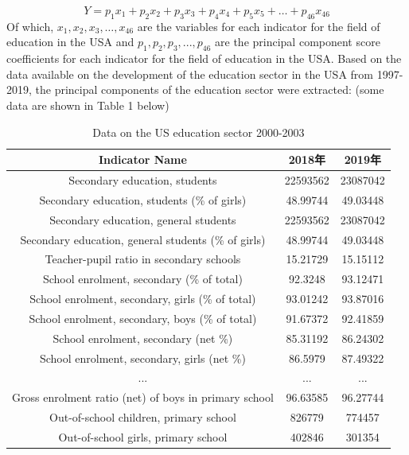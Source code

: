 \documentclass{apmcmthesis}
\begin{document}
\begin{equation}
Y=p_1x_1+p_2x_2+p_3x_3+p_4x_4+p_5x_5+…+p_{46}x_{46} 
\end{equation}
Of which, $ x_1,x_2,x_3,…,x_{46} $ are the variables for each indicator for the field of education in the USA and $ p_1,p_2,p_3,...,p_{46} $ are the principal component score coefficients for each indicator for the field of education in the USA.
Based on the data available on the development of the education sector in the USA from 1997-2019, the principal components of the education sector were extracted: (some data are shown in Table 1 below)
\begin{table}[H]
	\caption{Data on the US education sector 2000-2003}\label{tab:101} \centering
	\begin{tabular}{ccc}
		\toprule[1.5pt]
		Indicator Name        & 2018年    & 2019年      \\
		\midrule[1pt]
Secondary education, students                                              & 22593562 & 23087042 \\
Secondary education, students (\% of girls)                                & 48.99744 & 49.03448 \\
Secondary education, general students                                      & 22593562 & 23087042 \\
Secondary education, general students (\% of girls)                        & 48.99744 & 49.03448 \\
Teacher-pupil ratio in secondary schools                                   & 15.21729 & 15.15112 \\
School enrolment, secondary (\% of total)                                  & 92.3248  & 93.12471 \\
School enrolment, secondary, girls (\% of total)                           & 93.01242 & 93.87016 \\
School enrolment, secondary, boys (\% of total)                            & 91.67372 & 92.41859 \\
School enrolment, secondary (net \%)                                       & 85.31192 & 86.24302 \\
School enrolment, secondary, girls (net \%)                                & 86.5979  & 87.49322 \\
...&...&...\\
Gross enrolment ratio (net) of boys in primary school                      & 96.63585 & 96.27744 \\
Out-of-school children, primary school                                     & 826779   & 774457   \\
Out-of-school girls, primary school                                        & 402846   & 301354  \\
		\bottomrule[1.5pt]  
	\end{tabular}
\end{table}
\end{document}
